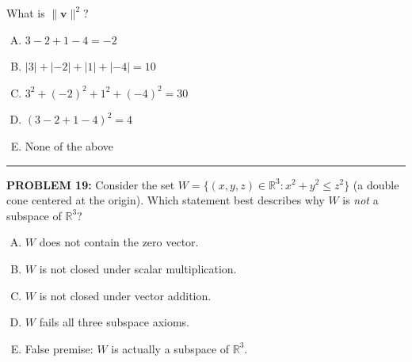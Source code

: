 \documentclass[12pt]{amsart}
\newcommand{\divider}{
  \vspace{-1em} %
  \noindent
  \raisebox{-0.15ex}{\textbullet}%
  \hspace{0.5em}%
  \rule[0.5ex]{0.95\textwidth}{1.0pt}%
  \hspace{0.5em}%
  \raisebox{-0.15ex}{\textbullet}%
  \vspace{0em} %
}
\begin{document}
{What is $\|\mathbf{v}\|^2$?

\begin{enumerate}[(A)]
\item $3 - 2 + 1 - 4 = -2$
\item $|3| + |-2| + |1| + |-4| = 10$
\item $3^2 + (-2)^2 + 1^2 + (-4)^2 = 30$
\item $(3 - 2 + 1 - 4)^2 = 4$
\item None of the above
\end{enumerate}


\divider


{\bf PROBLEM 19:}
% 
Consider the set $W = \{(x, y, z) \in \mathbb{R}^3 : x^2 + y^2 \leq z^2\}$ (a double cone centered at the origin). 
Which statement best describes why $W$ is \emph{not} a subspace of $\mathbb{R}^3$?

\begin{enumerate}[(A)]
\item $W$ does not contain the zero vector.
\item $W$ is not closed under scalar multiplication.
\item $W$ is not closed under vector addition.
\item $W$ fails all three subspace axioms.
\item False premise: $W$ is actually a subspace of $\mathbb{R}^3$.
\end{enumerate}


}
\end{document}
